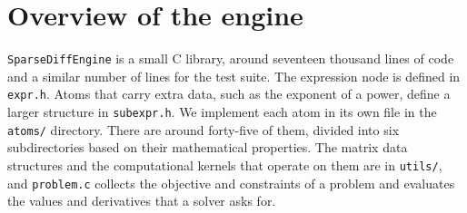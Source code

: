 \section{Overview of the engine}\label{sec:theme1-overview}

\texttt{SparseDiffEngine} is a small C library, around seventeen thousand lines
of code and a similar number of lines for the test suite.
The expression node is defined in \texttt{expr.h}. Atoms that carry extra data, such as
the exponent of a power, define a larger structure in \texttt{subexpr.h}.
We implement each atom in its own file in the \texttt{atoms/}
directory. There are around forty-five of them, divided into six subdirectories based on their
mathematical properties.
The matrix data structures and the computational kernels that operate on them are in
\texttt{utils/}, and \texttt{problem.c} collects the objective and constraints of a
problem and evaluates the values and derivatives that a solver asks for.

